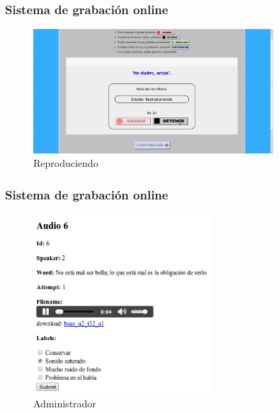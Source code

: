 \documentclass[mathserif]{beamer}%
\begin{document}
\begin{frame}
	\frametitle{Sistema de grabación online}
	
	\begin{figure}[h!]
		\centerline{\includegraphics[width=0.8\textwidth]{pag-play1} }
		\caption{Reproduciendo}
		\label{figEncuesta}
	\end{figure}
\end{frame}

\begin{frame}
	\frametitle{Sistema de grabación online}
	
	\begin{figure}[h!]
		\centerline{\includegraphics[width=0.6\textwidth]{categorizando_audios} }
		\caption{Administrador}
		\label{figEncuesta}
	\end{figure}
\end{frame}
\end{document}
